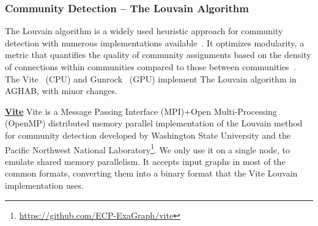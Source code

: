 \subsubsection{Community Detection -- The Louvain Algorithm}

The Louvain algorithm is a widely used heuristic approach for community detection with numerous implementations available~\cite{Blondel2008}. 
It optimizes modularity, a metric that quantifies the quality of community assignments based on the density of connections within communities compared to those between communities~\cite{Newman2004a}. 
The Vite~\cite{Ghosh2018,Ghosh2018a,Ghosh2019} (CPU) and Gunrock~\cite{Wang2016} (GPU) implement The Louvain algorithm in AGHAB, with minor changes.

    \underline{\textbf{Vite}}
        Vite is a Message Passing Interface (MPI)+Open Multi-Processing (OpenMP) distributed memory parallel implementation of the Louvain method for community detection developed by Washington State University and the Pacific Northwest National Laboratory\footnote{\url{https://github.com/ECP-ExaGraph/vite}}.
        We only use it on a single node, to emulate shared memory parallelism.
        It accepts input graphs in most of the common formats, converting them into a binary format that the Vite Louvain implementation uses.        

